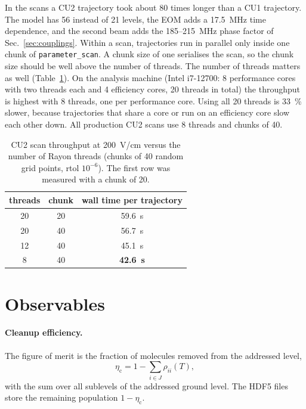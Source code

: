 \documentclass[11pt,a4paper,oneside]{report}
\newcommand{\code}[1]{\texttt{#1}}
\newcommand{\etac}{\eta_{\mathrm{c}}}
\begin{document}
In the scans a CU2 trajectory took about 80 times longer than a CU1 trajectory. The model has
56 instead of 21 levels, the EOM adds a \SI{17.5}{MHz} time dependence, and the second beam
adds the 185--\SI{215}{MHz} phase factor of Sec.~\ref{sec:couplings}. Within a scan,
trajectories run in parallel only inside one chunk of \code{parameter\_scan}. A chunk size of
one serialises the scan, so the chunk size should be well above the number of threads. The
number of threads matters as well (Table~\ref{tab:threads}). On the analysis machine (Intel
i7-12700: 8 performance cores with two threads each and 4 efficiency cores, 20 threads in total)
the throughput is highest with 8 threads, one per performance core. Using all 20 threads is
\SI{33}{\percent} slower, because trajectories that share a core or run on an efficiency core
slow each other down. All production CU2 scans use 8 threads and chunks of 40.

\begin{table}[htbp]
  \centering
  \caption[CU2 scan throughput versus number of threads]{CU2 scan throughput at
  \SI{200}{V/cm} versus the number of Rayon threads (chunks of 40 random grid points, rtol
  $10^{-6}$). The first row was measured with a chunk of 20.}
  \label{tab:threads}
  \small
  \begin{tabular}{ccc}
    \toprule
    threads & chunk & wall time per trajectory \\
    \midrule
    20 & 20 & \SI{59.6}{s} \\
    20 & 40 & \SI{56.7}{s} \\
    12 & 40 & \SI{45.1}{s} \\
    8 & 40 & \textbf{\SI{42.6}{s}} \\
    \bottomrule
  \end{tabular}
\end{table}

\section{Observables}
\label{sec:observables}

\paragraph{Cleanup efficiency.} The figure of merit is the fraction of molecules removed from
the addressed level,
\begin{equation}
  \etac=1-\sum_{i\in J}\rho_{ii}(T),
\end{equation}
with the sum over all sublevels of the addressed ground level. The HDF5 files store the
remaining population $1-\etac$.
\end{document}

